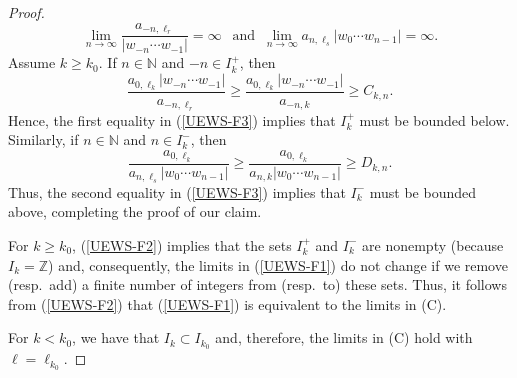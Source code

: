 \documentclass[10pt,a4paper]{amsart}
\newcommand{\N}{\mathbb{N}}   %
\newcommand{\Z}{\mathbb{Z}}   %
\begin{document}
\begin{proof}
\begin{equation}
\lim_{n \to \infty} \frac{a_{-n,\ell_r}}{|w_{-n} \cdots w_{-1}|} = \infty \ \ \text{ and } \
\lim_{n \to \infty} a_{n,\ell_s} |w_0 \cdots w_{n-1}| = \infty.
\end{equation}
Assume $k \geq k_0$. If $n \in \N$ and $-n \in I_k^+$, then
\[
\frac{a_{0,\ell_k} |w_{-n} \cdots w_{-1}|}{a_{-n,\ell_r}}   \geq \frac{a_{0,\ell_k} |w_{-n} \cdots w_{-1}|}{a_{-n,k}} \geq C_{k,n}.
\]
Hence, the first equality in (\ref{UEWS-F3}) implies that $I_k^+$ must be bounded below.
Similarly, if $n \in \N$ and $n \in I_k^-$, then
\[
\frac{a_{0,\ell_k}}{a_{n,\ell_s} |w_0 \cdots w_{n-1}|} \geq \frac{a_{0,\ell_k}}{a_{n,k} |w_0 \cdots w_{n-1}|} \geq D_{k,n}.
\]
Thus, the second equality in (\ref{UEWS-F3}) implies that $I_k^-$ must be bounded above, completing the proof of our claim.

For $k \geq k_0$, (\ref{UEWS-F2}) implies that the sets $I_k^+$ and $I_k^-$ are nonempty (because $I_k = \Z$) and, consequently, 
the limits in (\ref{UEWS-F1}) do not change if we remove (resp.\ add) a finite number of integers from (resp.\ to) these sets.
Thus, it follows from (\ref{UEWS-F2}) that (\ref{UEWS-F1}) is equivalent to the limits in (C).

For $k < k_0$, we have that $I_k \subset I_{k_0}$ and, therefore, the limits in (C) hold with $\ell = \ell_{k_0}$.


\end{proof}
\end{document}
